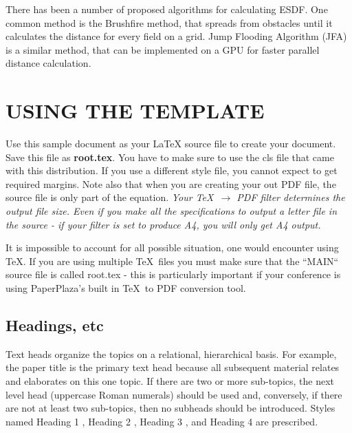 \documentclass[letterpaper, 10 pt, conference]{ieeeconf}  %
\begin{document}
There has been a number of proposed algorithms for calculating ESDF. One common method is the Brushfire method, that spreads from obstacles until it calculates the distance for every field on a grid.  Jump Flooding Algorithm (JFA) is a similar method, that can be implemented on a GPU for faster parallel distance calculation.  

\clearpage

\section{USING THE TEMPLATE}

Use this sample document as your LaTeX source file to create your document. Save this file as {\bf root.tex}. You have to make sure to use the cls file that came with this distribution. If you use a different style file, you cannot expect to get required margins. Note also that when you are creating your out PDF file, the source file is only part of the equation. {\it Your \TeX\ $\rightarrow$ PDF filter determines the output file size. Even if you make all the specifications to output a letter file in the source - if your filter is set to produce A4, you will only get A4 output. }

It is impossible to account for all possible situation, one would encounter using \TeX. If you are using multiple \TeX\ files you must make sure that the ``MAIN`` source file is called root.tex - this is particularly important if your conference is using PaperPlaza's built in \TeX\ to PDF conversion tool.

\subsection{Headings, etc}

Text heads organize the topics on a relational, hierarchical basis. For example, the paper title is the primary text head because all subsequent material relates and elaborates on this one topic. If there are two or more sub-topics, the next level head (uppercase Roman numerals) should be used and, conversely, if there are not at least two sub-topics, then no subheads should be introduced. Styles named  Heading 1 ,  Heading 2 ,  Heading 3 , and  Heading 4  are prescribed.
\end{document}
